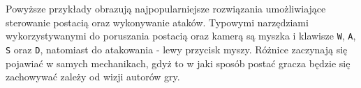 Powyższe przykłady obrazują najpopularniejsze rozwiązania umożliwiające sterowanie postacią oraz wykonywanie ataków.
Typowymi narzędziami wykorzystywanymi do poruszania postacią oraz kamerą są myszka i klawisze \texttt{W}, \texttt{A}, \texttt{S} oraz \texttt{D},
natomiast do atakowania - lewy przycisk myszy. Różnice zaczynają się pojawiać w samych mechanikach, gdyż to w jaki
sposób postać gracza będzie się zachowywać zależy od wizji autorów gry.
